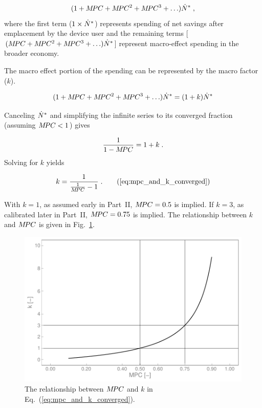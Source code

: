\documentclass[12pt]{article}\usepackage[]{graphicx}\usepackage[]{xcolor}
\makeatletter
\def\maxwidth{ %
  \ifdim\Gin@nat@width>\linewidth
    \linewidth
  \else
    \Gin@nat@width
  \fi
}
\newenvironment{knitrout}{}{} %
\makeatother
\begin{document}
\begin{equation} \label{eq:infinite_series_spending}
  (1 + M\!PC + M\!PC^2 + M\!PC^3 + \ldots) {\dot{N}}^* \; ,
\end{equation}
%
where the first term ($1 \times {\dot{N}}^*$) represents spending 
of net savings after emplacement by the device user and
the remaining terms 
[$(M\!PC + M\!PC^2 + M\!PC^3 + \ldots) {\dot{N}}^*$]
represent macro-effect spending in the broader economy.

The macro effect portion of the spending can be represented by the macro factor ($k$).

\begin{equation} \label{eq:mpc_and_k}
  (1 + M\!PC + M\!PC^2 + M\!PC^3 + \ldots) {\dot{N}}^* = (1 + k) {\dot{N}}^*
\end{equation}

Canceling ${\dot{N}}^*$ and simplifying the infinite series to its converged fraction
(assuming $M\!PC < 1$) gives

\begin{equation}
  \frac{1}{1 - M\!PC} = 1 + k \; .
\end{equation}
%
Solving for $k$ yields

\begin{equation}
  k = \frac{1}{\frac{1}{\MPC} - 1} \; .  \tag{\ref{eq:mpc_and_k_converged}}
\end{equation}

With $k = 1$, as assumed early in Part~II, 
$M\!PC = 0.5$ is implied.
If $k = 3$, as calibrated later in Part~II, 
$M\!PC = 0.75$ is implied.
The relationship between $k$ and $M\!PC$ is given in Fig.~\ref{fig:k_vs_mpc}.

\begin{knitrout}
\color{fgcolor}\begin{figure}

{\centering \includegraphics[width=\maxwidth]{figure/k_vs_mpc-1} 

}

\caption{The relationship between $M\!PC$ and $k$ in Eq.~(\ref{eq:mpc_and_k_converged}).}\label{fig:k_vs_mpc}
\end{figure}

\end{knitrout}
\end{document}
